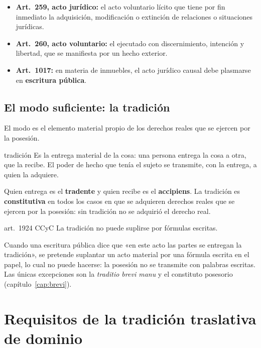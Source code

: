 \documentclass[12pt,oneside]{book}
\begin{document}
\begin{itemize}
    \item \textbf{Art.~259, acto jurídico:} el acto voluntario lícito que tiene por fin inmediato la adquisición, modificación o extinción de relaciones o situaciones jurídicas.
    \item \textbf{Art.~260, acto voluntario:} el ejecutado con discernimiento, intención y libertad, que se manifiesta por un hecho exterior.
    \item \textbf{Art.~1017:} en materia de inmuebles, el acto jurídico causal debe plasmarse en \textbf{escritura pública}.
\end{itemize}

\subsection{El modo suficiente: la tradición}

El modo es el elemento material propio de los derechos reales que se ejercen por la posesión.

\begin{definicion}{tradición}
Es la entrega material de la cosa: una persona entrega la cosa a otra, que la recibe. El poder de hecho que tenía el sujeto se transmite, con la entrega, a quien la adquiere.
\end{definicion}

Quien entrega es el \textbf{tradente} y quien recibe es el \textbf{accipiens}. La tradición es \textbf{constitutiva} en todos los casos en que se adquieren derechos reales que se ejercen por la posesión: sin tradición no se adquirió el derecho real.

\begin{regla}{art.~1924 CCyC}
La tradición no puede suplirse por fórmulas escritas.
\end{regla}

Cuando una escritura pública dice que «en este acto las partes se entregan la tradición», se pretende suplantar un acto material por una fórmula escrita en el papel, lo cual no puede hacerse: la posesión no se transmite con palabras escritas. Las únicas excepciones son la \textit{traditio brevi manu} y el constituto posesorio (capítulo~\ref{cap:brevi}).

\section{Requisitos de la tradición traslativa de dominio}
\end{document}
